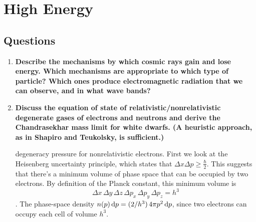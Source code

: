 \section{High Energy}
\subsection{Questions}
\begin{enumerate}
\item \textbf{Describe the mechanisms by which cosmic rays gain and lose energy. Which mechanisms
      are appropriate to which type of particle? Which ones produce electromagnetic
      radiation that we can observe, and in what wave bands?}

\item \textbf{Discuss the equation of state of relativistic/nonrelativistic degenerate gases of electrons
      and neutrons and derive the Chandrasekhar mass limit for white dwarfs. (A
      heuristic approach, as in Shapiro and Teukolsky, is sufficient.)}
      
       degeneracy pressure for nonrelativistic electrons. First we look at
      the Heisenberg uncertainty principle, which states that
      $\Delta x \Delta p \ge \frac{\hbar}{2}$.  This suggests that there's a minimum volume
      of phase space that can be occupied by two electrons.  By definition of the Planck constant, this minimum volume is
      \begin{dmath}
        \Delta x\,\Delta y\,\Delta z\,\Delta p_x\,\Delta p_y\,\Delta p_z = h^3
      \end{dmath}.
      The phase-space density $n(p)\,{\rm d} p = (2/h^3)\,4\pi p^2\,{\rm d} p$, since two electrons
      can occupy each cell of volume $h^3$.


\end{enumerate}
